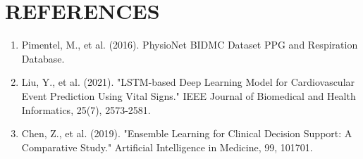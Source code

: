\documentclass[12pt,a4paper]{report}
\begin{document}
\newpage
\chapter*{REFERENCES}
\begin{enumerate}
    \item Pimentel, M., et al. (2016). PhysioNet BIDMC Dataset PPG and Respiration Database.
    \item Liu, Y., et al. (2021). "LSTM-based Deep Learning Model for Cardiovascular Event Prediction Using Vital Signs." IEEE Journal of Biomedical and Health Informatics, 25(7), 2573-2581.
    \item Chen, Z., et al. (2019). "Ensemble Learning for Clinical Decision Support: A Comparative Study." Artificial Intelligence in Medicine, 99, 101701.
\end{enumerate}
\end{document}
